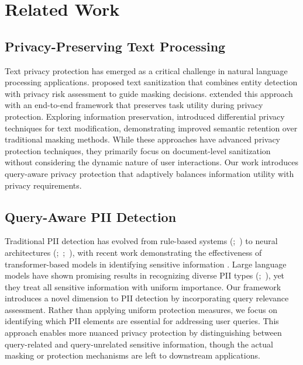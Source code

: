 \section{Related Work}
\subsection{Privacy-Preserving Text Processing}
Text privacy protection has emerged as a critical challenge in natural language processing applications. \citet{papadopoulou2022neural} proposed text sanitization that combines entity detection with privacy risk assessment to guide masking decisions. \citet{shen2024fire} extended this approach with an end-to-end framework that preserves task utility during privacy protection. Exploring information preservation, \citet{meisenbacher2024just} introduced differential privacy techniques for text modification, demonstrating improved semantic retention over traditional masking methods.
While these approaches have advanced privacy protection techniques, they primarily focus on document-level sanitization without considering the dynamic nature of user interactions. Our work introduces query-aware privacy protection that adaptively balances information utility with privacy requirements.

\subsection{Query-Aware PII Detection}
Traditional PII detection has evolved from rule-based systems (\citealp{ruch2000medical};~\citealp{douglass2005identification}) to neural architectures (\citealp{deleger2013large};~\citealp{dernoncourt2017identification};~\citealp{johnson2020deidentification}), with recent work demonstrating the effectiveness of transformer-based models in identifying sensitive information \citep{asimopoulos2024benchmarking}. Large language models have shown promising results in recognizing diverse PII types (\citealp{singhal2024identifying};~\citealp{gpt4pii}), yet they treat all sensitive information with uniform importance.
Our framework introduces a novel dimension to PII detection by incorporating query relevance assessment. Rather than applying uniform protection measures, we focus on identifying which PII elements are essential for addressing user queries. This approach enables more nuanced privacy protection by distinguishing between query-related and query-unrelated sensitive information, though the actual masking or protection mechanisms are left to downstream applications.

